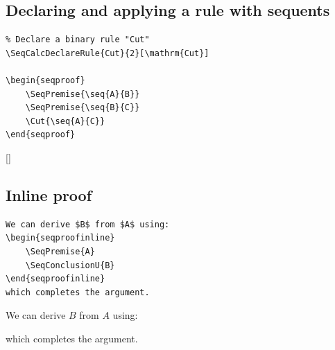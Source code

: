 \documentclass[a4paper,1pt]{article}
\begin{document}
\subsection{Declaring and applying a rule with sequents}
\begin{tcolorbox}[seqexample,title={Custom rule with sequents}]
\begin{lstlisting}
% Declare a binary rule "Cut"
\SeqCalcDeclareRule{Cut}{2}[\mathrm{Cut}]

\begin{seqproof}
    \SeqPremise{\seq{A}{B}}
    \SeqPremise{\seq{B}{C}}
    \Cut{\seq{A}{C}}
\end{seqproof}
\end{lstlisting}
\tcblower
{}[]
\begin{seqproof}
\end{seqproof}
\end{tcolorbox}

\subsection{Inline proof}
\begin{tcolorbox}[seqexample,title={Inline proof}]
\begin{lstlisting}
We can derive $B$ from $A$ using:
\begin{seqproofinline}
    \SeqPremise{A}
    \SeqConclusionU{B}
\end{seqproofinline}
which completes the argument.
\end{lstlisting}
\tcblower
We can derive $B$ from $A$ using:
\begin{seqproofinline}
\end{seqproofinline}
which completes the argument.
\end{tcolorbox}
\end{document}
